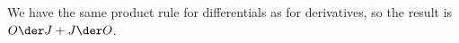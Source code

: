We have the same product rule for differentials as for derivatives, so the result is $O\der J+J\der O$.
